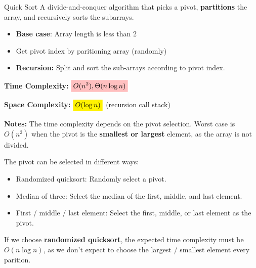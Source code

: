 \begin{definition}
    {Quick Sort}
    A divide-and-conquer algorithm that picks a pivot, \textbf{partitions} the array, and recursively sorts the subarrays.

    \begin{itemize}
        \item \textbf{Base case}: Array length is less than 2
        \item Get pivot index by paritioning array (randomly)
        \item \textbf{Recursion:} Split and sort the sub-arrays according to pivot index.
    \end{itemize}

    \textbf{Time Complexity:} $\mathcolorbox{pink}{O(n^2),\Theta(n \log n)}$

    \textbf{Space Complexity:} $\mathcolorbox{yellow}{O(\log n)}$ (recursion call stack)

    \textbf{Notes:} The time complexity depends on the pivot selection. Worst case is $O(n^2)$ when the pivot is the \textbf{smallest or largest} element, as the array is not divided.

    The pivot can be selected in different ways:
    \begin{itemize}
        \item Randomized quicksort: Randomly select a pivot.
        \item Median of three: Select the median of the first, middle, and last element.
        \item First / middle / last element: Select the first, middle, or last element as the pivot.
    \end{itemize}

    If we choose \textbf{randomized quicksort}, the expected time complexity must be $O(n \log n)$, as we don't expect to choose the largest / smallest element every parition.

\end{definition}

